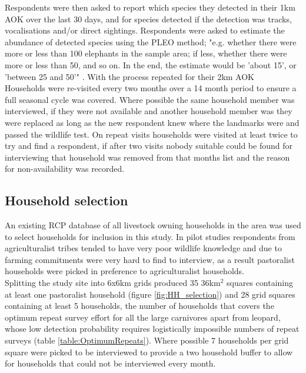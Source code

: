 Respondents were then asked to report which species they detected in their 1km AOK over the last 30 days, and for species detected if the detection was tracks, vocalisations and/or direct sightings. Respondents were asked to estimate the abundance of detected species using the PLEO method; "e.g. whether there were more or less than 100 elephants in the sample area; if less, whether there were more or less than 50, and so on. In the end, the estimate would be 'about 15', or 'between 25 and 50'" \cite{VanderHoeven2004}. With the process repeated for their 2km AOK\\

Households were re-visited every two months over a 14 month period to ensure a full seasonal cycle was covered. Where possible the same household member was interviewed, if they were not available and another household member was they were replaced as long as the new respondent knew where the landmarks were and passed the wildlife test. On repeat visits households were visited at least twice to try and find a respondent, if after two visits nobody suitable could be found for interviewing that household was removed from that months list and the reason for non-availability was recorded.\\

\subsection{Household selection}

An existing RCP database of all livestock owning households in the area was used to select households for inclusion in this study. In pilot studies respondents from agriculturalist tribes tended to have very poor wildlife knowledge and due to farming commitments were very hard to find to interview, as a result pastoralist households were picked in preference to agriculturalist households.\\

Splitting the study site into 6x6km grids produced 35 36km$^2$ squares containing at least one pastoralist household (figure \ref{fig:HH_selection}) and 28 grid squares containing at least 5 households, the number of households that covers the optimum repeat survey effort for all the large carnivores apart from leopard, whose low detection probability requires logistically impossible numbers of repeat surveys (table \ref{table:OptimumRepeats}). Where possible 7 households per grid square were picked to be interviewed to provide a two household buffer to allow for households that could not be interviewed every month.\\

